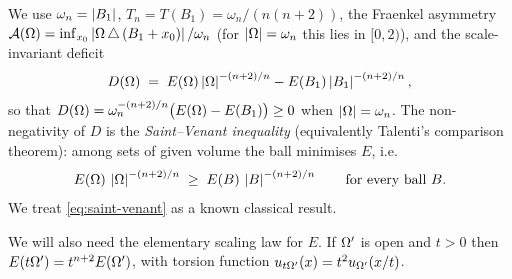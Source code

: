 We use $\omega_n=\left|B_1\right|$, $T_n=T(B_1)=\omega_n/(n(n+2))$, the Fraenkel
asymmetry $\mathcal A(\Omega)=\inf_{x_0}\left|\Omega\,\triangle\,(B_1+x_0)\right|/\omega_n$
(for $\left|\Omega\right|=\omega_n$ this lies in $[0,2)$), and the scale-invariant
deficit
\begin{equation}\label{eq:deficit-def}
   D(\Omega)\;=\;E(\Omega)\left|\Omega\right|^{-(n+2)/n}-E(B_1)\left|B_1\right|^{-(n+2)/n},
\end{equation}
so that $D(\Omega)=\omega_n^{-(n+2)/n}\bigl(E(\Omega)-E(B_1)\bigr)\ge0$ when
$\left|\Omega\right|=\omega_n$.
The non-negativity of $D$ is the
\emph{Saint--Venant inequality} (equivalently Talenti's comparison
theorem): among sets of given volume the ball minimises $E$, i.e.
\begin{equation}\label{eq:saint-venant}
   E(\Omega)\,\left|\Omega\right|^{-(n+2)/n}\;\ge\;E(B)\,\left|B\right|^{-(n+2)/n}
   \qquad\text{for every ball }B.
\end{equation}
We treat \eqref{eq:saint-venant} as a known classical result.

We will also need the elementary scaling law for $E$. If $\Omega'$ is open
and $t>0$ then $E(t\Omega')=t^{n+2}E(\Omega')$, with torsion function
$u_{t\Omega'}(x)=t^2u_{\Omega'}(x/t)$.

